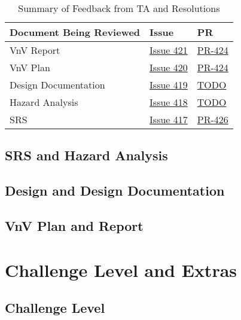 \documentclass{article}
\begin{document}
\begin{table}[h!]
\centering
\begin{tabularx}{\textwidth}{lXl}
\toprule
\textbf{Document Being Reviewed} & \textbf{Issue} & \textbf{PR} \\
\midrule
VnV Report & \href{https://github.com/SyntaxSentinels/SyntaxSentinels/issues/421}{Issue 421} & \href{https://github.com/SyntaxSentinels/SyntaxSentinels/pull/424}{PR-424} \\
VnV Plan & \href{https://github.com/SyntaxSentinels/SyntaxSentinels/issues/420}{Issue 420} & \href{https://github.com/SyntaxSentinels/SyntaxSentinels/pull/424}{PR-424} \\
Design Documentation & \href{https://github.com/SyntaxSentinels/SyntaxSentinels/issues/419}{Issue 419} & \href{TODO}{TODO} \\
Hazard Analysis & \href{https://github.com/SyntaxSentinels/SyntaxSentinels/issues/418}{Issue 418} & \href{TODO}{TODO} \\
SRS & \href{https://github.com/SyntaxSentinels/SyntaxSentinels/issues/417}{Issue 417} & \href{https://github.com/SyntaxSentinels/SyntaxSentinels/pull/426}{PR-426} \\

\bottomrule
\end{tabularx}
\caption{Summary of Feedback from TA and Resolutions}
\label{tab:TA_feedback_summary}
\end{table}

\subsection{SRS and Hazard Analysis}

\subsection{Design and Design Documentation}

\subsection{VnV Plan and Report}

\section{Challenge Level and Extras}

\subsection{Challenge Level}
\end{document}
